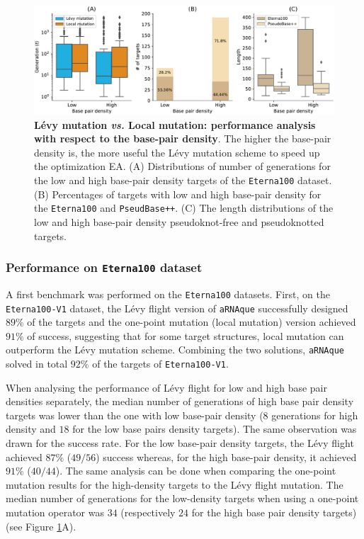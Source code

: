 \begin{figure}[ht]
	\includegraphics[width=1.\linewidth]{../res/images/arnaque/fig10.pdf}
	\caption{\textbf{Lévy mutation \emph{vs.} Local mutation: performance analysis with respect to the base-pair density}. The higher the base-pair density is, the more useful the Lévy mutation scheme to speed up the optimization EA. (A) Distributions of number of generations for the low and high base-pair density targets of the \texttt{Eterna100} dataset. (B) Percentages of targets with low and high base-pair density for the \texttt{Eterna100} and \texttt{PseudBase++}. (C) The length distributions of the low and high base-pair density pseudoknot-free and pseudoknotted targets.} \label{Fig:eterna_performance}
\end{figure}  

\subsubsection{Performance on \texttt{Eterna100} dataset}

A first benchmark was performed on the \texttt{Eterna100} datasets. First, on the \texttt{Eterna100-V1} dataset, the Lévy flight version of \texttt{aRNAque} successfully designed $89\%$ of the targets and the one-point mutation (local mutation) version achieved $91\%$ of success, suggesting that for some target structures, local mutation can outperform the Lévy mutation scheme. Combining the two solutions, \texttt{aRNAque} solved in total $92\%$ of the targets of \texttt{Eterna100-V1}.

When analysing the performance of Lévy flight for low and high base pair densities separately, the median number of generations of high base pair density targets was lower than the one with low base-pair density ($8$ generations for high density and $18$ for the low base pairs density targets). The same observation was drawn for the success rate. For the low base-pair density targets, the Lévy flight achieved $87\%$ ($49/56$) success whereas, for the high base-pair density, it achieved $91\%$ ($40/44$). The same analysis can be done when comparing the one-point mutation results for the high-density targets to the Lévy flight mutation. The median number of generations for the low-density targets when using a one-point mutation operator was $34$ (respectively $24$ for the high base pair density targets) (see Figure \ref{Fig:eterna_performance}A). 


